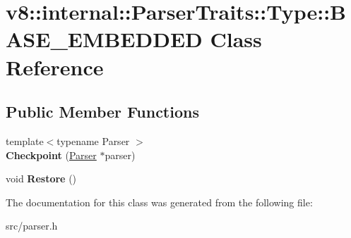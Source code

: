 \hypertarget{classv8_1_1internal_1_1_parser_traits_1_1_type_1_1_b_a_s_e___e_m_b_e_d_d_e_d}{}\section{v8\+:\+:internal\+:\+:Parser\+Traits\+:\+:Type\+:\+:B\+A\+S\+E\+\_\+\+E\+M\+B\+E\+D\+D\+E\+D Class Reference}
\label{classv8_1_1internal_1_1_parser_traits_1_1_type_1_1_b_a_s_e___e_m_b_e_d_d_e_d}
\subsection*{Public Member Functions}
\begin{DoxyCompactItemize}
\item 
\hypertarget{classv8_1_1internal_1_1_parser_traits_1_1_type_1_1_b_a_s_e___e_m_b_e_d_d_e_d_ac7cc52b5749108b183d72020613ef4ff}{}{\footnotesize template$<$typename Parser $>$ }\\{\bfseries Checkpoint} (\hyperlink{classv8_1_1internal_1_1_parser}{Parser} $\ast$parser)\label{classv8_1_1internal_1_1_parser_traits_1_1_type_1_1_b_a_s_e___e_m_b_e_d_d_e_d_ac7cc52b5749108b183d72020613ef4ff}

\item 
\hypertarget{classv8_1_1internal_1_1_parser_traits_1_1_type_1_1_b_a_s_e___e_m_b_e_d_d_e_d_adcf972541129bd48fe7891bfa78c422e}{}void {\bfseries Restore} ()\label{classv8_1_1internal_1_1_parser_traits_1_1_type_1_1_b_a_s_e___e_m_b_e_d_d_e_d_adcf972541129bd48fe7891bfa78c422e}

\end{DoxyCompactItemize}


The documentation for this class was generated from the following file\+:\begin{DoxyCompactItemize}
\item 
src/parser.\+h\end{DoxyCompactItemize}
